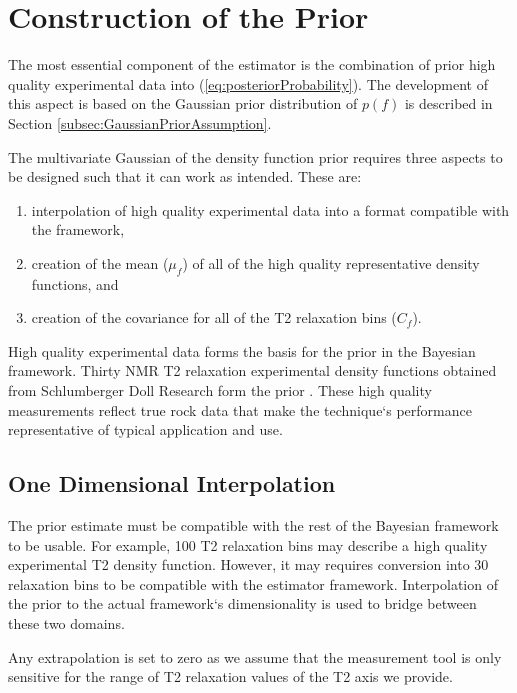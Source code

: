 \section{Construction of the Prior}
\label{section:makingPrior}
The most essential component of the estimator is the combination of prior high quality experimental data into (\ref{eq:posteriorProbability}). The development of this aspect is based on the Gaussian prior distribution of $p(f)$ is described in Section \ref{subsec:GaussianPriorAssumption}.

The multivariate Gaussian of the density function prior requires three aspects to be designed such that it can work as intended. These are:
\begin{enumerate}
    \item interpolation of high quality experimental data into a format compatible with the framework, 
    \item creation of the mean ($\mu_f$) of all of the high quality representative density functions, and
    \item creation of the covariance for all of the T2 relaxation bins ($C_f$).
\end{enumerate}

High quality experimental data forms the basis for the prior in the Bayesian framework. Thirty NMR T2 relaxation experimental density functions obtained from Schlumberger Doll Research form the prior \cite{dobbie_2018_experimentalData}. These high quality measurements reflect true rock data that make the technique`s performance representative of typical application and use. 


\subsection{One Dimensional Interpolation} \label{section:oneDimInterpolation}
The prior estimate must be compatible with the rest of the Bayesian framework to be usable. For example, 100 T2 relaxation bins may describe a high quality experimental T2 density function. However, it may requires conversion into 30 relaxation bins to be compatible with the estimator framework. Interpolation of the prior to the actual framework`s dimensionality is used to bridge between these two domains.  

Any extrapolation is set to zero as we assume that the measurement tool is only sensitive for the range of T2 relaxation values of the T2 axis we provide.

